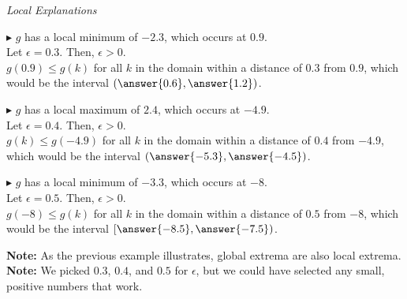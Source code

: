 \documentclass{ximera}
\begin{document}
\begin{explanation} \textit{Local Explanations}




$\blacktriangleright$ $g$ has a local minimum of $-2.3$, which occurs at $0.9$. \\


Let $\epsilon = 0.3$.  Then, $\epsilon > 0$.   \\
$g(0.9) \leq g(k)$ for all $k$ in the domain within a distance of $0.3$ from $0.9$, which would be the interval $\left(\answer{0.6}, \answer{1.2}\right)$.




$\blacktriangleright$ $g$ has a local maximum of $2.4$, which occurs at $-4.9$. \\






Let $\epsilon = 0.4$.  Then, $\epsilon > 0$.  \\
$g(k) \leq g(-4.9)$ for all $k$ in the domain within a distance of $0.4$ from $-4.9$, which would be the interval $\left(\answer{-5.3}, \answer{-4.5}\right)$.




$\blacktriangleright$ $g$ has a local minimum of $-3.3$, which occurs at $-8$. \\





Let $\epsilon = 0.5$.  Then, $\epsilon > 0$. \\

$g(-8) \leq g(k)$ for all $k$ in the domain within a distance of $0.5$ from $-8$, which would be the interval $\left[\answer{-8.5}, \answer{-7.5}\right)$.


\end{explanation}


\textbf{Note:} As the previous example illustrates, global extrema are also local extrema. \\
\textbf{Note:} We picked $0.3$, $0.4$, and $0.5$ for $\epsilon$, but we could have selected any small, positive numbers that work.
\end{document}
